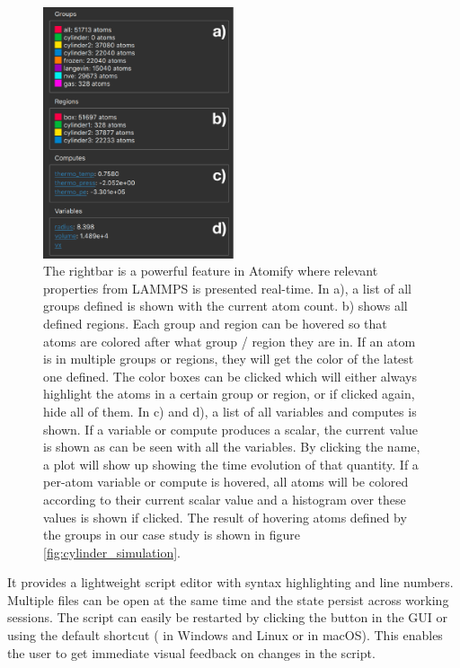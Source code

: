 \documentclass[aps,pre,twocolumn,letterpaper,floatfix,nofootinbib]{revtex4}
\begin{document}
\begin{figure}
	\centering
	\includegraphics[width=0.5\textwidth]{figures/rightbar.pdf}
	\caption{
		The rightbar is a powerful feature in Atomify where relevant
		properties from LAMMPS is presented real-time.
		In a), a list of all groups defined is shown with the current atom count.
		b) shows all defined regions. Each group and region can be hovered so that atoms
		are colored after what group / region they are in. If an atom is in multiple
		groups or regions, they will get the color of the latest one defined.
		The color boxes can be clicked which will either always highlight the atoms in a certain group or region,
		or if clicked again, hide all of them.
		In c) and d), a list of all variables and computes is shown. If a variable or compute
		produces a scalar, the current value is shown as can be seen with all the variables.
		By clicking the name, a plot will show up showing the time evolution of that quantity.
		If a per-atom variable or compute is hovered, all atoms will be colored according to their
		current scalar value and a histogram over these values is shown if clicked.
		The result of hovering atoms defined by the groups in our case study is shown in figure \ref{fig:cylinder_simulation}.
    }
	\label{fig:rightbar}
\end{figure}

It provides a lightweight script editor with syntax highlighting and line numbers.
Multiple files can be open at the same time and the state persist across working sessions.
The script can easily be restarted by clicking the button in the GUI or using
the default shortcut ( in Windows and Linux or  in macOS).
This enables the user to get immediate visual feedback on changes in the script.
\end{document}
